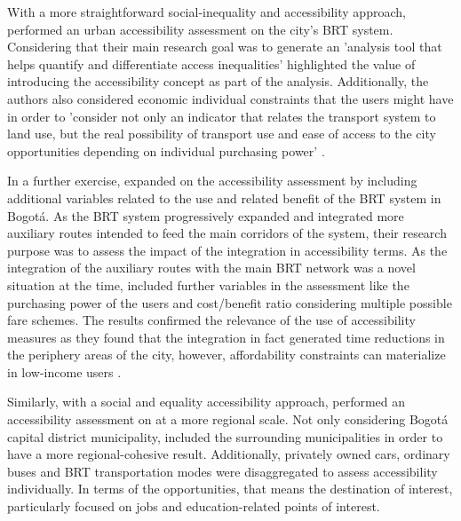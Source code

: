 \documentclass[12pt, a4paper]{report}
\begin{document}
With a more straightforward social-inequality and accessibility approach, \cite{bocarejos.TransportAccessibilitySocial2012} performed an urban accessibility assessment on the city's BRT system. Considering that their main research goal was to generate an 'analysis tool that helps quantify and differentiate access inequalities' \cite{bocarejos.TransportAccessibilitySocial2012} highlighted the value of introducing the accessibility concept as part of the analysis. Additionally, the authors also considered economic individual constraints that the users might have in order to 'consider not only an indicator that relates the transport system to land use, but the real possibility of transport use and ease of access to the city opportunities depending on individual purchasing power' \cite{bocarejos.TransportAccessibilitySocial2012}.

In a further exercise, \cite{bocarejoAccessibilityAnalysisIntegrated2014} expanded on the accessibility assessment by including additional variables related to the use and related benefit of the BRT system in Bogotá. As the BRT system progressively expanded and integrated more auxiliary routes intended to feed the main corridors of the system, their research purpose was to assess the impact of the integration in accessibility terms. As the integration of the auxiliary routes with the main BRT network was a novel situation at the time, \cite{bocarejoAccessibilityAnalysisIntegrated2014} included further variables in the assessment like the purchasing power of the users and cost/benefit ratio considering multiple possible fare schemes. The results confirmed the relevance of the use of accessibility measures as they found that the integration in fact generated time reductions in the periphery areas of the city, however, affordability constraints can materialize in low-income users \citep{bocarejoAccessibilityAnalysisIntegrated2014}.

Similarly, with a social and equality accessibility approach, \cite{guzmanAssessingEquityTransport2017} performed an accessibility assessment on at a more regional scale. Not only considering Bogotá capital district municipality, \cite{guzmanAssessingEquityTransport2017} included the surrounding municipalities in order to have a more regional-cohesive result. Additionally, privately owned cars, ordinary buses and BRT transportation modes were disaggregated to assess accessibility individually. In terms of the opportunities, that means the destination of interest,\cite{guzmanAssessingEquityTransport2017} particularly focused on jobs and education-related points of interest.
\end{document}
